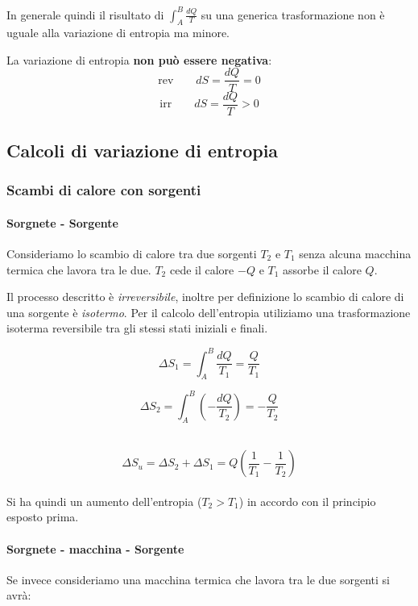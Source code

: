 \documentclass[x11names]{report}
\begin{document}
In generale quindi il risultato di \(\int_{A}^{B}\frac{dQ}{T}\) su una generica trasformazione non è uguale alla variazione di entropia ma minore.

La variazione di entropia \textbf{non può essere negativa}:
\[ 
\text{rev} \qquad dS = \frac{dQ}{T} = 0
\]
\[ 
\text{irr} \qquad dS = \frac{dQ}{T} > 0
\]
\subsection{Calcoli di variazione di entropia}
\subsubsection{Scambi di calore con sorgenti}
\paragraph{Sorgnete - Sorgente}
Consideriamo lo scambio di calore tra due sorgenti \(T_{2}\) e \(T_{1}\) senza alcuna macchina termica che lavora tra le due. \(T_{2}\) cede il calore \(-Q\) e \(T_{1}\) assorbe il calore \(Q\). 


Il processo descritto è \textit{irreversibile}, inoltre per definizione lo scambio di calore di una sorgente è \textit{isotermo}. Per il calcolo dell'entropia utiliziamo una trasformazione isoterma reversibile tra gli stessi stati iniziali e finali.\\

\begin{minipage}{0.49\textwidth}
	\[ 
	\Delta S_{1} = \int_{A}^{B}\frac{dQ}{T_{1}} = \frac{Q}{T_{1}}
	\]
\end{minipage}
\begin{minipage}{0.49\textwidth}
	\[ 
	\Delta S_{2} = \int_{A}^{B}\left(-\frac{dQ}{T_{2}}\right) = -\frac{Q}{T_{2}}
	\]
\end{minipage}  \\

\[ 
\Delta S_{u} = \Delta S_{2} + \Delta S_{1}  = Q\left(\frac{1}{T_{1}} - \frac{1}{T_{2}}\right)
\] \\
Si ha quindi un aumento dell'entropia (\(T_{2} > T_{1}\)) in accordo con il principio esposto prima.


\noindent
\paragraph{Sorgnete - macchina - Sorgente}Se invece consideriamo una macchina termica che lavora tra le due sorgenti si avrà: \\
\end{document}
